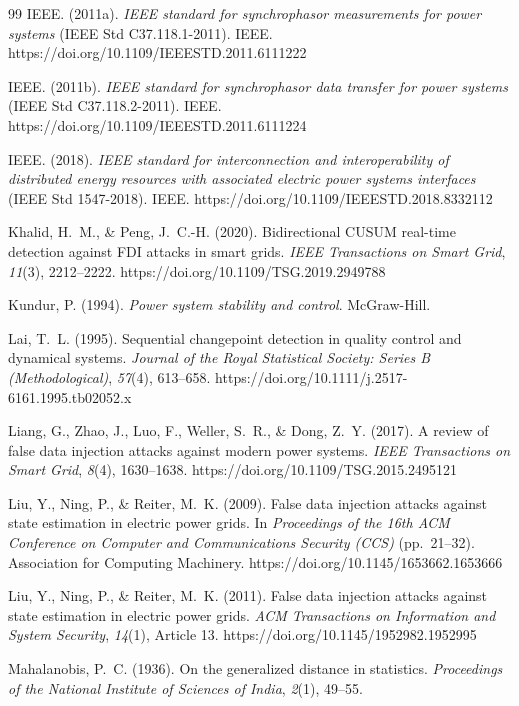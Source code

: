 \documentclass[11pt,a4paper]{report}
\begin{document}
\begin{thebibliography}{99}
IEEE. (2011a). \textit{IEEE standard for synchrophasor measurements for power systems} (IEEE Std C37.118.1-2011). IEEE. https://doi.org/10.1109/IEEESTD.2011.6111222

IEEE. (2011b). \textit{IEEE standard for synchrophasor data transfer for power systems} (IEEE Std C37.118.2-2011). IEEE. https://doi.org/10.1109/IEEESTD.2011.6111224

IEEE. (2018). \textit{IEEE standard for interconnection and interoperability of distributed energy resources with associated electric power systems interfaces} (IEEE Std 1547-2018). IEEE. https://doi.org/10.1109/IEEESTD.2018.8332112

Khalid, H.~M., \& Peng, J.~C.-H. (2020). Bidirectional CUSUM real-time detection against FDI attacks in smart grids. \textit{IEEE Transactions on Smart Grid}, \textit{11}(3), 2212--2222. https://doi.org/10.1109/TSG.2019.2949788

Kundur, P. (1994). \textit{Power system stability and control}. McGraw-Hill.

Lai, T.~L. (1995). Sequential changepoint detection in quality control and dynamical systems. \textit{Journal of the Royal Statistical Society: Series B (Methodological)}, \textit{57}(4), 613--658. https://doi.org/10.1111/j.2517-6161.1995.tb02052.x

Liang, G., Zhao, J., Luo, F., Weller, S.~R., \& Dong, Z.~Y. (2017). A review of false data injection attacks against modern power systems. \textit{IEEE Transactions on Smart Grid}, \textit{8}(4), 1630--1638. https://doi.org/10.1109/TSG.2015.2495121

Liu, Y., Ning, P., \& Reiter, M.~K. (2009). False data injection attacks against state estimation in electric power grids. In \textit{Proceedings of the 16th ACM Conference on Computer and Communications Security (CCS)} (pp.~21--32). Association for Computing Machinery. https://doi.org/10.1145/1653662.1653666

Liu, Y., Ning, P., \& Reiter, M.~K. (2011). False data injection attacks against state estimation in electric power grids. \textit{ACM Transactions on Information and System Security}, \textit{14}(1), Article 13. https://doi.org/10.1145/1952982.1952995

Mahalanobis, P.~C. (1936). On the generalized distance in statistics. \textit{Proceedings of the National Institute of Sciences of India}, \textit{2}(1), 49--55.


\end{thebibliography}
\end{document}
